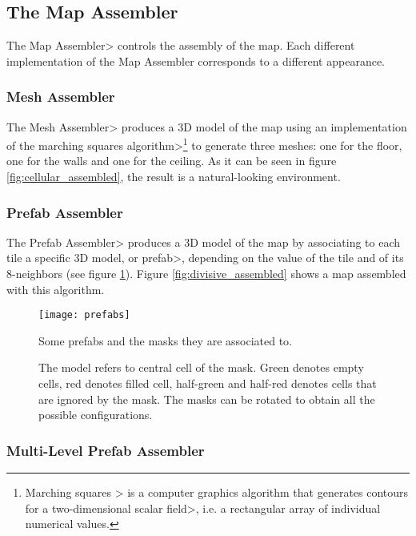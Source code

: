 
\subsection{The Map Assembler}

The \<Map Assembler> controls the assembly of the map. Each different implementation of the Map Assembler corresponds to a different appearance.


\subsubsection{Mesh Assembler}

The \<Mesh Assembler> produces a 3D model of the map using an implementation of the \<marching squares algorithm>\footnote{\<Marching squares > is a computer graphics algorithm that generates contours for a \<two-dimensional scalar field>, i.e. a rectangular array of individual numerical values.} to generate three meshes: one for the floor, one for the walls and one for the ceiling. As it can be seen in figure \ref{fig:cellular_assembled}, the result is a natural-looking environment.


\subsubsection{Prefab Assembler}

The \<Prefab Assembler> produces a 3D model of the map by associating to each tile a specific 3D model, or \<prefab>, depending on the value of the tile and of its 8-neighbors (see figure \ref{fig:prefabs}). Figure \ref{fig:divisive_assembled} shows a map assembled with this algorithm.

\begin{figure}
\centering
\texttt{[image: prefabs]}
\caption{Some prefabs and the masks they are associated to.}
\caption*{The model refers to central cell of the mask. Green denotes empty cells, red denotes filled cell, half-green and half-red denotes cells that are ignored by the mask. The masks can be rotated to obtain all the possible configurations.}
\label{fig:prefabs}
\end{figure}


\subsubsection{Multi-Level Prefab Assembler}

